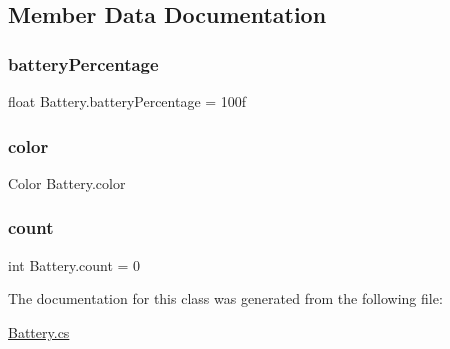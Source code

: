 \subsection{Member Data Documentation}
\mbox{\label{class_battery_accada3fc6604b1021283f4d8021b1a47}} 
\subsubsection{\texorpdfstring{battery\+Percentage}{batteryPercentage}}
{\footnotesize\ttfamily float Battery.\+battery\+Percentage = 100f\hspace{0.3cm}{\ttfamily [static]}}





\mbox{\label{class_battery_aefbbc4c5859dbe406f1a62b4e75afb17}} 
\subsubsection{\texorpdfstring{color}{color}}
{\footnotesize\ttfamily Color Battery.\+color}

\mbox{\label{class_battery_a979bd28f1e0c80b77d0de24f3a7c86b2}} 
\subsubsection{\texorpdfstring{count}{count}}
{\footnotesize\ttfamily int Battery.\+count = 0\hspace{0.3cm}{\ttfamily [static]}}



The documentation for this class was generated from the following file\+:\begin{DoxyCompactItemize}
\item 
\hyperlink{_battery_8cs}{Battery.\+cs}\end{DoxyCompactItemize}
